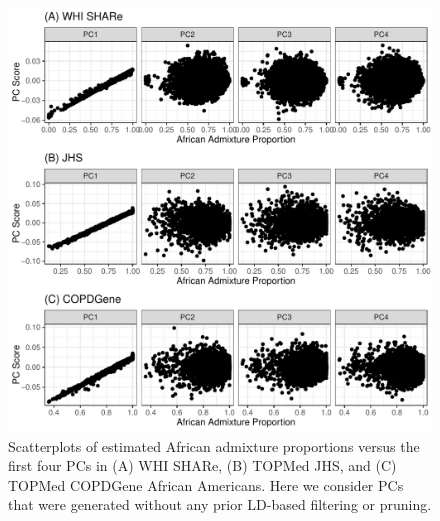 \documentclass[12pt]{article}
\begin{document}
\begin{figure}[!htb]
\center
\includegraphics[width=\textwidth]{figs/pcs_vs_global/pcs_vs_global}
\caption{Scatterplots of estimated African admixture proportions versus the first four PCs in (A) WHI SHARe, (B) TOPMed JHS, and (C) TOPMed COPDGene African Americans. Here we consider PCs that were generated without any prior LD-based filtering or pruning.}
\label{fig:pcsvsglob}
\end{figure}
\end{document}
